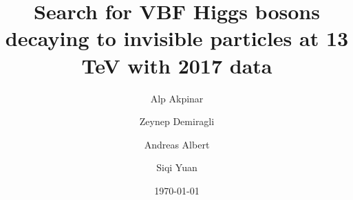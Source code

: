 


\title{Search for VBF Higgs bosons decaying to invisible particles at 13 TeV with 2017 data}

\address[inst1]{Boston University (US)}
\author*[inst1]{Alp Akpinar}
\author*[inst1]{Zeynep Demiragli}
\author*[inst1]{Andreas Albert}
\author*[inst1]{Siqi Yuan}

\date{\today}



